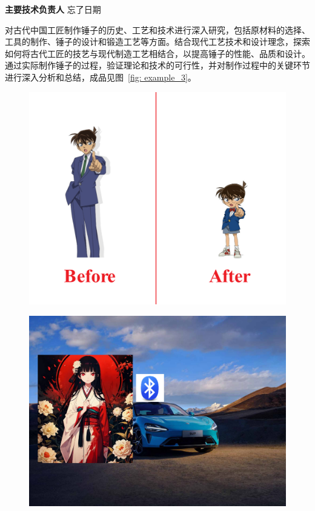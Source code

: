 \documentclass[11pt]{article}
\begin{document}
    \textbf{主要技术负责人} \hfill 忘了日期
    
    对古代中国工匠制作锤子的历史、工艺和技术进行深入研究，包括原材料的选择、工具的制作、锤子的设计和锻造工艺等方面。结合现代工艺技术和设计理念，探索如何将古代工匠的技艺与现代制造工艺相结合，以提高锤子的性能、品质和设计。通过实际制作锤子的过程，验证理论和技术的可行性，并对制作过程中的关键环节进行深入分析和总结，成品见图~\ref{fig: example_3}。


    \newpage


    \begin{figure}[h!]
        \centering
        \scriptsize
        \begin{minipage}[b]{0.32\linewidth}
            \includegraphics[width=\textwidth]{images/example_image_1.png}   
            \label{fig: example_1} 
        \end{minipage}
        \begin{minipage}[b]{0.32\linewidth}
            \includegraphics[width=\textwidth]{images/example_image_2.png}   

\end{minipage}
\end{figure}
\end{document}
